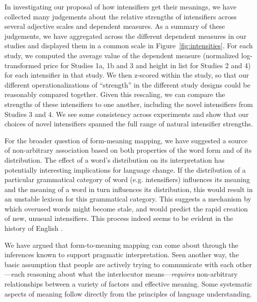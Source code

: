 In investigating our proposal of how intensifiers get their meanings, we have collected many judgements about the relative strengths of intensifiers across several adjective scales and dependent measures.
As a summary of these judgements, we have aggregated across the different dependent measures in our studies and displayed them in a common scale in Figure~\ref{fig:intensities}.
For each study, we computed the average value of the dependent measure (normalized log-transformed price for Studies 1a, 1b and 3 and height in list for Studies 2 and 4) for each intensifier in that study. We then z-scored within the study, so that our different operationalizations of ``strength'' in the different study designs could be reasonably compared together.
Given this rescaling, we can compare the strengths of these intensifiers to one another, including the novel intensifiers from Studies 3 and 4.
We see some consistency across experiments and show that our choices of novel intensifiers spanned the full range of natural intensifier strengths.

For the broader question of form-meaning mapping, we have suggested a source of non-arbitrary association based on both properties of the word form and of its distribution.
The effect of a word's distribution on its interpretation has potentially interesting implications for language change.
If the distribution of a particular grammatical category of word (e.g. intensifiers) influences its meaning and the meaning of a word in turn influences its distribution, this would result in an unstable lexicon for this grammatical category.
This suggests a mechanism by which overused words might become stale, and would predict the rapid creation of new, unusual intensifiers.
This process indeed seems to be evident in the history of English \cite{bolinger_degree_1972}.

We have argued that form-to-meaning mapping can come about through the inferences known to support pragmatic interpretation.
Seen another way, the basic assumption that people are actively trying to communicate with each other---each reasoning about what the interlocutor means---\emph{requires} non-arbitrary relationships between a variety of factors and effective meaning.
Some systematic aspects of meaning follow directly from the principles of language understanding.

